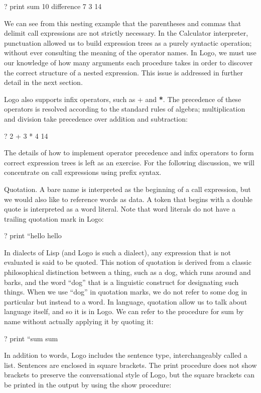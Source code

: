 \documentclass[letterpaper,10pt,dvipdfmx]{sphinxmanual}
\begin{document}
? print sum 10 difference 7 3
14

We can see from this nesting example that the parentheses and commas that delimit call expressions are not strictly necessary. In the Calculator interpreter, punctuation allowed us to build expression trees as a purely syntactic operation; without ever consulting the meaning of the operator names. In Logo, we must use our knowledge of how many arguments each procedure takes in order to discover the correct structure of a nested expression. This issue is addressed in further detail in the next section.

Logo also supports infix operators, such as + and {\color{red}\bfseries{}*}. The precedence of these operators is resolved according to the standard rules of algebra; multiplication and division take precedence over addition and subtraction:

? 2 + 3 * 4
14

The details of how to implement operator precedence and infix operators to form correct expression trees is left as an exercise. For the following discussion, we will concentrate on call expressions using prefix syntax.

Quotation. A bare name is interpreted as the beginning of a call expression, but we would also like to reference words as data. A token that begins with a double quote is interpreted as a word literal. Note that word literals do not have a trailing quotation mark in Logo:

? print ``hello
hello

In dialects of Lisp (and Logo is such a dialect), any expression that is not evaluated is said to be quoted. This notion of quotation is derived from a classic philosophical distinction between a thing, such as a dog, which runs around and barks, and the word ``dog'' that is a linguistic construct for designating such things. When we use ``dog'' in quotation marks, we do not refer to some dog in particular but instead to a word. In language, quotation allow us to talk about language itself, and so it is in Logo. We can refer to the procedure for sum by name without actually applying it by quoting it:

? print ``sum
sum

In addition to words, Logo includes the sentence type, interchangeably called a list. Sentences are enclosed in square brackets. The print procedure does not show brackets to preserve the conversational style of Logo, but the square brackets can be printed in the output by using the show procedure:
\end{document}
